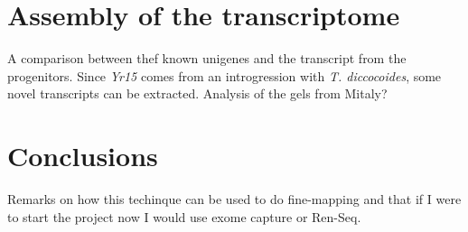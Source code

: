 \section{Assembly of the transcriptome} 
A comparison between thef known unigenes and the transcript from the progenitors. Since \textit{Yr15} comes from an introgression with \textit{T. diccocoides}, some novel transcripts can be extracted. Analysis of the gels from Mitaly? 

\section{Conclusions} 
Remarks on how this techinque can be used to do fine-mapping and that if I were to start the project now I would  use exome capture or Ren-Seq. 